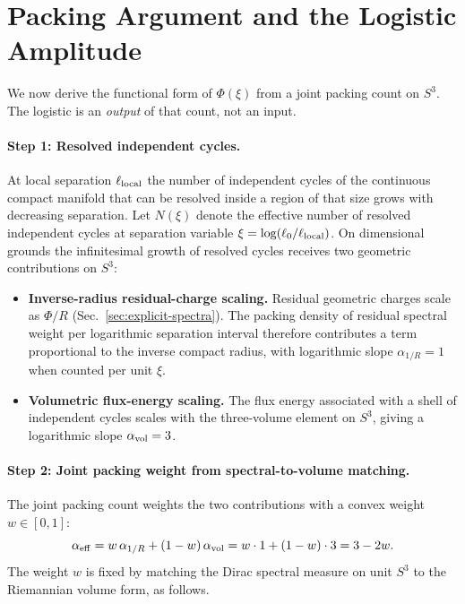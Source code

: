 \documentclass[11pt,a4paper]{article}
\begin{document}
\section{Packing Argument and the Logistic Amplitude}
\label{sec:packing}

We now derive the functional form of \(\Phi(\xi)\) from a joint packing count on \(S^3\). The logistic is an \emph{output} of that count, not an input.

\paragraph{Step 1: Resolved independent cycles.}
At local separation \(\ell_{\rm local}\) the number of independent cycles of the continuous compact manifold that can be resolved inside a region of that size grows with decreasing separation. Let \(N(\xi)\) denote the effective number of resolved independent cycles at separation variable \(\xi=\log(\ell_0/\ell_{\rm local})\). On dimensional grounds the infinitesimal growth of resolved cycles receives two geometric contributions on \(S^3\):

\begin{itemize}[leftmargin=*]
\item \textbf{Inverse-radius residual-charge scaling.} Residual geometric charges scale as \(\Phi/R\) (Sec.~\ref{sec:explicit-spectra}). The packing density of residual spectral weight per logarithmic separation interval therefore contributes a term proportional to the inverse compact radius, with logarithmic slope \(\alpha_{1/R}=1\) when counted per unit \(\xi\).
\item \textbf{Volumetric flux-energy scaling.} The flux energy associated with a shell of independent cycles scales with the three-volume element on \(S^3\), giving a logarithmic slope \(\alpha_{\rm vol}=3\).
\end{itemize}

\paragraph{Step 2: Joint packing weight from spectral-to-volume matching.}
The joint packing count weights the two contributions with a convex weight \(w\in[0,1]\):
\begin{equation}
\alpha_{\rm eff}=w\,\alpha_{1/R}+(1-w)\,\alpha_{\rm vol}=w\cdot 1+(1-w)\cdot 3=3-2w.
\label{eq:alpha-eff}
\end{equation}
The weight \(w\) is fixed by matching the Dirac spectral measure on unit \(S^3\) to the Riemannian volume form, as follows.
\end{document}
